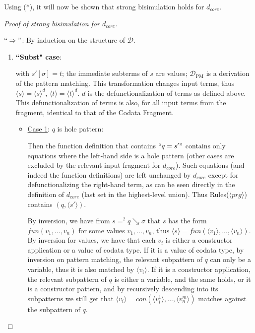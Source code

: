 Using (*), it will now be shown that strong bisimulation holds for $d_{core}$.

\begin{proof}[Proof of strong bisimulation for $d_{core}$] ~

$`` \Rightarrow "$: By induction on the structure of $\mathcal{D}$.

\begin{enumerate}
\item \textbf{``Subst" case}:

\begin{prooftree}
\end{prooftree}

with $s'[\sigma] = t$; the immediate subterms of $s$ are values; $\mathcal{D}_{\textrm{PM}}$ is a derivation of the pattern matching. This transformation changes input terms, thus $\langle s \rangle = \langle s \rangle^d$, $\langle t \rangle = \langle t \rangle^d$. $d$ is the defunctionalization of terms as defined above. This defunctionalization of terms is also, for all input terms from the fragment, identical to that of the Codata Fragment.

\begin{itemize}

\item \underline{Case 1}: $q$ is hole pattern:

Then the function definition that contains $`` q = s' "$ contains only equations where the left-hand side is a hole pattern (other cases are excluded by the relevant input fragment for $d_{core}$). Such equations (and indeed the function definitions) are left unchanged by $d_{core}$ except for defunctionalizing the right-hand term, as can be seen directly in the definition of $d_{core}$ (last set in the highest-level union). Thus Rules($\langle prg \rangle$) contains $(q, \langle s' \rangle)$.

By inversion, we have from $s =^? q \searrow \sigma$ that $s$ has the form $fun(v_1, ..., v_n)$ for some values $v_1, ..., v_n$, thus $\langle s \rangle = fun(\langle v_1 \rangle, ..., \langle v_n \rangle)$. By inversion for values, we have that each $v_i$ is either a constructor application or a value of codata type. If it is a value of codata type, by inversion on pattern matching, the relevant subpattern of $q$ can only be a variable, thus it is also matched by $\langle v_i \rangle$. If it is a constructor application, the relevant subpattern of $q$ is either a variable, and the same holds, or it is a constructor pattern, and by recursively descending into its subpatterns we still get that $\langle v_i \rangle = con(\langle v^1_i \rangle, ..., \langle v^m_n \rangle)$ matches against the subpattern of $q$.


\end{itemize}
\end{enumerate}
\end{proof}

